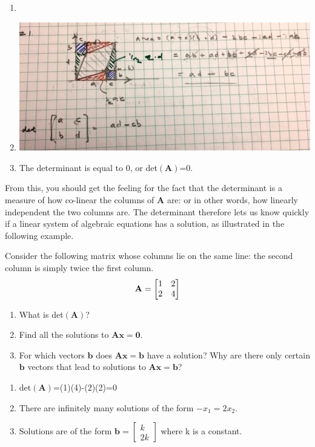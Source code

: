 \begin{sol}
	\begin{enumerate}
		\item \item \begin{center}
		    \includegraphics[scale=0.5]{FacesNight3/figs/parallelogram.png}
		\end{center}
	\item The determinant is equal to 0, or det$(\mathbf{A})$=0.
	\end{enumerate}
\end{sol}

From this, you should get the feeling for the fact that the determinant is a measure of how co-linear the columns of $\mathbf{A}$ are:  or in other words, how linearly independent the two columns are.  The determinant therefore lets us know quickly if a linear system of algebraic equations has a solution, as illustrated in the following example.

\begin{prob}
Consider the following matrix whose columns lie on the same line: the second column is simply twice the first column.
\begin{align}
\mathbf{A} = \begin{bmatrix} 1 & 2 \\ 2 & 4\end{bmatrix}
\end{align}
\begin{enumerate}
\item What is det$(\mathbf{A})$?
\item Find all the solutions to $\mathbf{A} \mathbf{x} = \mathbf{0}$.
\item For which vectors $\mathbf{b}$ does $\mathbf{A} \mathbf{x} = \mathbf{b}$ have a solution? Why are there only certain $\mathbf{b}$ vectors that lead to solutions to $\mathbf{A} \mathbf{x} = \mathbf{b}$?
\end{enumerate}
\end{prob}

\begin{sol}
	\begin{enumerate}
		\item det$(\mathbf{A})$=(1)(4)-(2)(2)=0
		\item There are infinitely many solutions of the form $-x_{1}=2x_{2}$.
		\item Solutions are of the form $\mathbf{b}=\begin{bmatrix} k \\ 2k \end{bmatrix}$ where k is a constant.
	\end{enumerate}
\end{sol}

